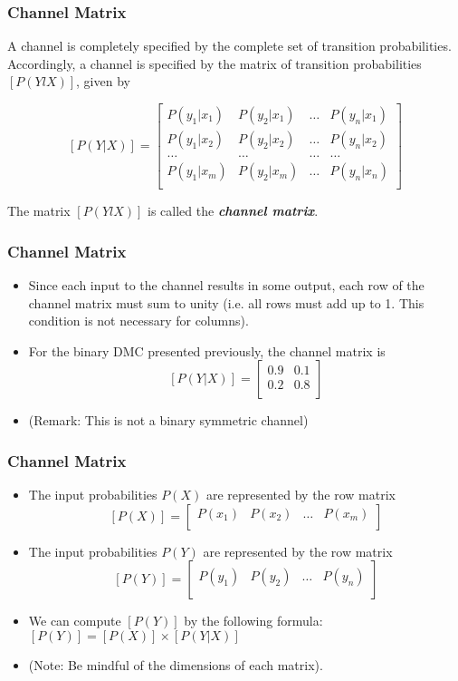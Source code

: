 \documentclass[a4]{beamer}
\begin{document}
\begin{frame}
\frametitle{Channel Matrix}

A channel is completely specified by the complete set of transition probabilities. Accordingly, a
channel is specified by the matrix of transition probabilities $[P(YlX)]$, given by

\[  [P(Y|X)]  = \left[ \begin{array}{cccc}
P(y_1|x_1) & P(y_2|x_1) & \ldots & P(y_n|x_1) \\
P(y_1|x_2) & P(y_2|x_2) & \ldots & P(y_n|x_2) \\
\ldots & \ldots & \ldots & \ldots \\
P(y_1|x_m) & P(y_2|x_m) & \ldots & P(y_n|x_n) \\
\end{array} \right] \]


The matrix $[P(YlX)]$ is called the \textbf{\emph{channel matrix}}.
 \end{frame}

\begin{frame}
\frametitle{Channel Matrix}
\begin{itemize}
\item Since each input to the channel results in some
output, each row of the channel matrix must sum to unity (i.e. all rows must add up to 1. This condition is not necessary for columns).
\item For the binary DMC presented previously, the channel matrix is
\[  [P(Y|X)]  = \left[ \begin{array}{cc}
0.9 & 0.1  \\
0.2 & 0.8 \\
\end{array} \right] \]
\item (Remark: This is not a binary symmetric channel)
\end{itemize}
\end{frame}


\begin{frame}
\frametitle{Channel Matrix}
\begin{itemize}
\item The input probabilities $P(X)$ are represented by the row matrix
\[  [P(X)]  = \left[ \begin{array}{cccc}
P(x_1) & P(x_2) & \ldots & P(x_m) \\
\end{array} \right] \]
\item The input probabilities $P(Y)$ are represented by the row matrix
\[  [P(Y)]  = \left[ \begin{array}{cccc}
P(y_1) & P(y_2) & \ldots & P(y_n) \\
\end{array} \right] \]
\item We can compute $[P(Y)] $ by the following formula: $[P(Y)]  = [P(X)]\times [P(Y|X)]$
\item (Note: Be mindful of the dimensions of each matrix).
\end{itemize}
\end{frame}
\end{document}

